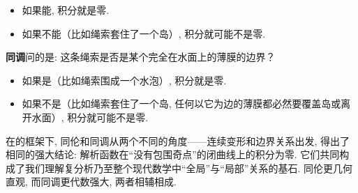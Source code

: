\documentclass[UTF8]{ctexart}
\begin{document}
        \begin{itemize}
            \item 如果能, 积分就是零. 
            \item 如果不能（比如绳索套住了一个岛）, 积分就可能不是零. 
        \end{itemize}

        \textbf{同调}问的是: 这条绳索是否是某个完全在水面上的薄膜的边界？

        \begin{itemize}
            \item 如果是（比如绳索围成一个水泡）, 积分就是零. 
            \item 如果不是（比如绳索套住了一个岛, 任何以它为边的薄膜都必然要覆盖岛或离开水面）, 积分就可能不是零. 
        \end{itemize}

        在\CauchyThm 的框架下, 同伦和同调从两个不同的角度——连续变形和边界关系出发, 得出了相同的强大结论: 解析函数在“没有包围奇点”的闭曲线上的积分为零. 它们共同构成了我们理解复分析乃至整个现代数学中“全局”与“局部”关系的基石. 同伦更几何直观, 而同调更代数强大, 两者相辅相成. 
\end{document}

